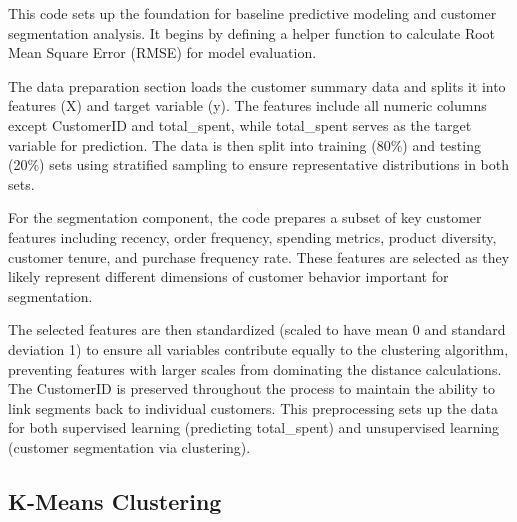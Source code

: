 \documentclass[
]{article}
\newenvironment{Shaded}{\begin{snugshade}}{\end{snugshade}}
\newcommand{\CommentTok}[1]{\textcolor[rgb]{0.56,0.35,0.01}{\textit{#1}}}
\newcommand{\FunctionTok}[1]{\textcolor[rgb]{0.13,0.29,0.53}{\textbf{#1}}}
\newcommand{\NormalTok}[1]{#1}
\newcommand{\OtherTok}[1]{\textcolor[rgb]{0.56,0.35,0.01}{#1}}
\newcommand{\SpecialCharTok}[1]{\textcolor[rgb]{0.81,0.36,0.00}{\textbf{#1}}}
\begin{document}
\begin{Shaded}
\end{Shaded}

This code sets up the foundation for baseline predictive modeling and
customer segmentation analysis. It begins by defining a helper function
to calculate Root Mean Square Error (RMSE) for model evaluation.

The data preparation section loads the customer summary data and splits
it into features (X) and target variable (y). The features include all
numeric columns except CustomerID and total\_spent, while total\_spent
serves as the target variable for prediction. The data is then split
into training (80\%) and testing (20\%) sets using stratified sampling
to ensure representative distributions in both sets.

For the segmentation component, the code prepares a subset of key
customer features including recency, order frequency, spending metrics,
product diversity, customer tenure, and purchase frequency rate. These
features are selected as they likely represent different dimensions of
customer behavior important for segmentation.

The selected features are then standardized (scaled to have mean 0 and
standard deviation 1) to ensure all variables contribute equally to the
clustering algorithm, preventing features with larger scales from
dominating the distance calculations. The CustomerID is preserved
throughout the process to maintain the ability to link segments back to
individual customers. This preprocessing sets up the data for both
supervised learning (predicting total\_spent) and unsupervised learning
(customer segmentation via clustering).\newpage

\subsection{K-Means Clustering}\label{k-means-clustering}
\end{document}
